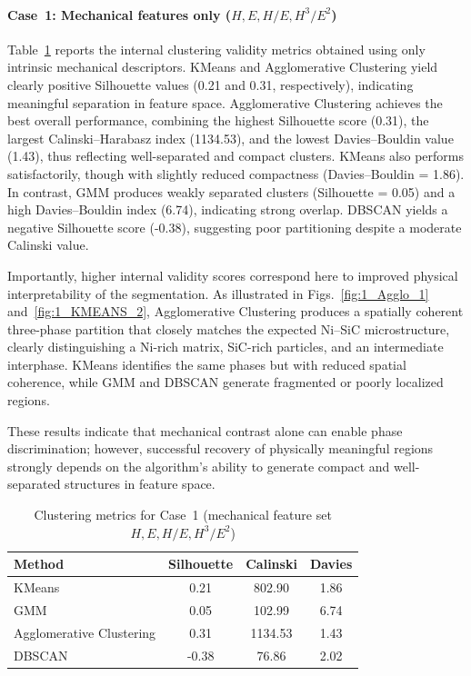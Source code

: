 \documentclass[final,3p,times]{elsarticle}
\begin{document}
\paragraph{Case~1: Mechanical features only (\(H, E, H/E, H^3/E^2\))}

Table~\ref{tab:case1_scores} reports the internal clustering validity metrics obtained using only intrinsic mechanical descriptors. KMeans and Agglomerative Clustering yield clearly positive Silhouette values (0.21 and 0.31, respectively), indicating meaningful separation in feature space. Agglomerative Clustering achieves the best overall performance, combining the highest Silhouette score (0.31), the largest Calinski--Harabasz index (1134.53), and the lowest Davies--Bouldin value (1.43), thus reflecting well-separated and compact clusters. KMeans also performs satisfactorily, though with slightly reduced compactness (Davies--Bouldin = 1.86). In contrast, GMM produces weakly separated clusters (Silhouette = 0.05) and a high Davies--Bouldin index (6.74), indicating strong overlap. DBSCAN yields a negative Silhouette score (-0.38), suggesting poor partitioning despite a moderate Calinski value.

Importantly, higher internal validity scores correspond here to improved physical interpretability of the segmentation. As illustrated in Figs.~\ref{fig:1_Agglo_1} and~\ref{fig:1_KMEANS_2}, Agglomerative Clustering produces a spatially coherent three-phase partition that closely matches the expected Ni--SiC microstructure, clearly distinguishing a Ni-rich matrix, SiC-rich particles, and an intermediate interphase. KMeans identifies the same phases but with reduced spatial coherence, while GMM and DBSCAN generate fragmented or poorly localized regions.

These results indicate that mechanical contrast alone can enable phase discrimination; however, successful recovery of physically meaningful regions strongly depends on the algorithm’s ability to generate compact and well-separated structures in feature space.

\begin{table}[htbp]
    \centering
    \caption{Clustering metrics for Case~1 (mechanical feature set \(H, E, H/E, H^3/E^2\))}
    \label{tab:case1_scores}
    \begin{tabular}{lccc}
        \hline
        \textbf{Method} & \textbf{Silhouette} & \textbf{Calinski} & \textbf{Davies} \\
        \hline
        KMeans                   & 0.21 & 802.90  & 1.86 \\
        GMM                      & 0.05 & 102.99  & 6.74 \\
        Agglomerative Clustering & 0.31 & 1134.53 & 1.43 \\
        DBSCAN                  & -0.38 & 76.86 & 2.02 \\
        \hline
    \end{tabular}
\end{table}
\end{document}
